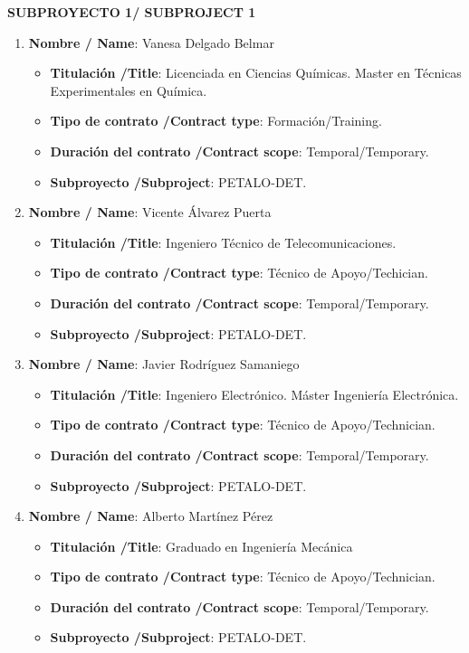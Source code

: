 \noindent\textbf{SUBPROYECTO 1/ SUBPROJECT 1}
\begin{enumerate}
\item {\bf Nombre / Name}: Vanesa Delgado Belmar
\begin{itemize}
\item {\bf Titulación /Title}:  Licenciada en Ciencias Químicas. Master en Técnicas Experimentales en Química.
\item {\bf Tipo de contrato /Contract type}: Formación/Training.
\item {\bf Duración del contrato /Contract scope}: Temporal/Temporary.
\item {\bf Subproyecto /Subproject}: PETALO-DET.
\end{itemize}
\item {\bf Nombre / Name}: Vicente Álvarez Puerta
\begin{itemize}
\item {\bf Titulación /Title}: Ingeniero Técnico de Telecomunicaciones.
\item {\bf Tipo de contrato /Contract type}: Técnico de Apoyo/Techician.
\item {\bf Duración del contrato /Contract scope}: Temporal/Temporary.
\item {\bf Subproyecto /Subproject}: PETALO-DET.
\end{itemize}
\item {\bf Nombre / Name}: Javier Rodríguez Samaniego
\begin{itemize}
\item {\bf Titulación /Title}: Ingeniero Electrónico. Máster Ingeniería Electrónica.
\item {\bf Tipo de contrato /Contract type}: Técnico de Apoyo/Technician.
\item {\bf Duración del contrato /Contract scope}: Temporal/Temporary.
\item {\bf Subproyecto /Subproject}: PETALO-DET.
\end{itemize}
\item {\bf Nombre / Name}: Alberto Martínez Pérez
\begin{itemize}
\item {\bf Titulación /Title}: Graduado en Ingeniería Mecánica
\item {\bf Tipo de contrato /Contract type}: Técnico de Apoyo/Technician.
\item {\bf Duración del contrato /Contract scope}: Temporal/Temporary.
\item {\bf Subproyecto /Subproject}: PETALO-DET.
\end{itemize}

\end{enumerate}

